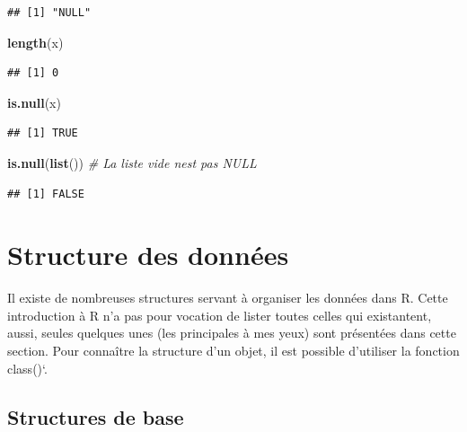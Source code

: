 \documentclass[
  11pt,
]{book}
\newenvironment{Shaded}{\begin{snugshade}}{\end{snugshade}}
\newcommand{\CommentTok}[1]{\textcolor[rgb]{0.56,0.35,0.01}{\textit{#1}}}
\newcommand{\KeywordTok}[1]{\textcolor[rgb]{0.13,0.29,0.53}{\textbf{#1}}}
\newcommand{\NormalTok}[1]{#1}
\numberwithin{equation}{section}
\numberwithin{countremarque}{section}
\begin{document}
\begin{lstlisting}
## [1] "NULL"
\end{lstlisting}

\begin{Shaded}
\begin{Highlighting}[]
\KeywordTok{length}\NormalTok{(x)}
\end{Highlighting}
\end{Shaded}

\begin{lstlisting}
## [1] 0
\end{lstlisting}

\begin{Shaded}
\begin{Highlighting}[]
\KeywordTok{is.null}\NormalTok{(x)}
\end{Highlighting}
\end{Shaded}

\begin{lstlisting}
## [1] TRUE
\end{lstlisting}

\begin{Shaded}
\begin{Highlighting}[]
\KeywordTok{is.null}\NormalTok{(}\KeywordTok{list}\NormalTok{()) }\CommentTok{\# La liste vide n\textquotesingle{}est pas NULL}
\end{Highlighting}
\end{Shaded}

\begin{lstlisting}
## [1] FALSE
\end{lstlisting}

\hypertarget{structures}{%
\section{Structure des données}\label{structures}}

Il existe de nombreuses structures servant à organiser les données dans R. Cette introduction à R n'a pas pour vocation de lister toutes celles qui existantent, aussi, seules quelques unes (les principales à mes yeux) sont présentées dans cette section. Pour connaître la structure d'un objet, il est possible d'utiliser la fonction \texttt{}class()`.

\hypertarget{structures-de-base}{%
\subsection{Structures de base}\label{structures-de-base}}
\end{document}
